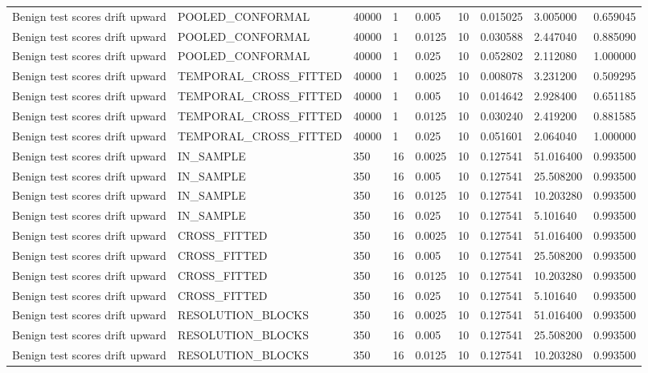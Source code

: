 \begin{tabular}{lllllllll}
Benign test scores drift upward & POOLED\_CONFORMAL & 40000 & 1 & 0.005 & 10 & 0.015025 & 3.005000 & 0.659045 \\
Benign test scores drift upward & POOLED\_CONFORMAL & 40000 & 1 & 0.0125 & 10 & 0.030588 & 2.447040 & 0.885090 \\
Benign test scores drift upward & POOLED\_CONFORMAL & 40000 & 1 & 0.025 & 10 & 0.052802 & 2.112080 & 1.000000 \\
Benign test scores drift upward & TEMPORAL\_CROSS\_FITTED & 40000 & 1 & 0.0025 & 10 & 0.008078 & 3.231200 & 0.509295 \\
Benign test scores drift upward & TEMPORAL\_CROSS\_FITTED & 40000 & 1 & 0.005 & 10 & 0.014642 & 2.928400 & 0.651185 \\
Benign test scores drift upward & TEMPORAL\_CROSS\_FITTED & 40000 & 1 & 0.0125 & 10 & 0.030240 & 2.419200 & 0.881585 \\
Benign test scores drift upward & TEMPORAL\_CROSS\_FITTED & 40000 & 1 & 0.025 & 10 & 0.051601 & 2.064040 & 1.000000 \\
Benign test scores drift upward & IN\_SAMPLE & 350 & 16 & 0.0025 & 10 & 0.127541 & 51.016400 & 0.993500 \\
Benign test scores drift upward & IN\_SAMPLE & 350 & 16 & 0.005 & 10 & 0.127541 & 25.508200 & 0.993500 \\
Benign test scores drift upward & IN\_SAMPLE & 350 & 16 & 0.0125 & 10 & 0.127541 & 10.203280 & 0.993500 \\
Benign test scores drift upward & IN\_SAMPLE & 350 & 16 & 0.025 & 10 & 0.127541 & 5.101640 & 0.993500 \\
Benign test scores drift upward & CROSS\_FITTED & 350 & 16 & 0.0025 & 10 & 0.127541 & 51.016400 & 0.993500 \\
Benign test scores drift upward & CROSS\_FITTED & 350 & 16 & 0.005 & 10 & 0.127541 & 25.508200 & 0.993500 \\
Benign test scores drift upward & CROSS\_FITTED & 350 & 16 & 0.0125 & 10 & 0.127541 & 10.203280 & 0.993500 \\
Benign test scores drift upward & CROSS\_FITTED & 350 & 16 & 0.025 & 10 & 0.127541 & 5.101640 & 0.993500 \\
Benign test scores drift upward & RESOLUTION\_BLOCKS & 350 & 16 & 0.0025 & 10 & 0.127541 & 51.016400 & 0.993500 \\
Benign test scores drift upward & RESOLUTION\_BLOCKS & 350 & 16 & 0.005 & 10 & 0.127541 & 25.508200 & 0.993500 \\
Benign test scores drift upward & RESOLUTION\_BLOCKS & 350 & 16 & 0.0125 & 10 & 0.127541 & 10.203280 & 0.993500 \\

\end{tabular}
